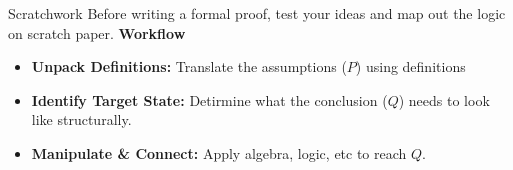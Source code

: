 \documentclass{beamer}
\begin{document}
\begin{frame}{Scratchwork}
    Before writing a formal proof, test your ideas and map out the logic on scratch paper.
\vspace{0.5em}
  \textbf{Workflow}
  \begin{itemize}
    \item \textbf{Unpack Definitions:} Translate the assumptions ($P$) using definitions
    \item \textbf{Identify Target State:} Detirmine what the conclusion ($Q$) needs to look like structurally.
    \item \textbf{Manipulate \& Connect:} Apply algebra, logic, etc to reach $Q$.
  \end{itemize}
\end{frame}
\end{document}
